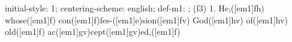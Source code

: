 initial-style: 1;
centering-scheme: english;
def-m1: \grealign;
(f3) 1. He,([em1]fh) whose([em1]f) con([em1]f)fes-([em1]e)sion([em1]fv) God([em1]hv) of([em1]hv) old([em1]f) ac([em1]gv)cept([em1]gv)ed,([em1]f)